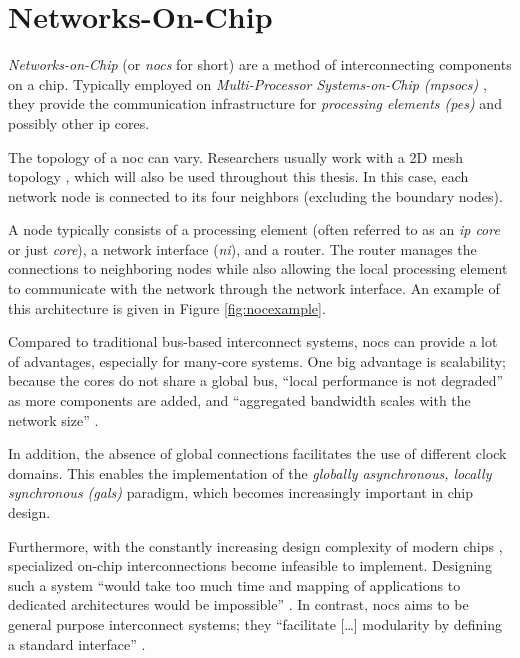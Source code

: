 \section{Networks-On-Chip}\label{sec:networkonchipfun}
\textit{Networks-on-Chip} (or \textit{\glspl{noc}} for short) are a method of interconnecting components on a chip. Typically employed on
\textit{Multi-Processor Systems-on-Chip (\glspl{mpsoc})} \cites(e.g.)(){ivanov05nocintroduction}{biswas15routerattack}{tatas16designingnocs}, they
provide the communication infrastructure for \textit{processing elements (\glspl{pe})} and possibly other \gls{ip} cores.

The topology of a \gls{noc} can vary. Researchers usually work with a 2D mesh topology
\cites(e.g.)(){frey17hardenednoc}{kumar02networkonchip}{fernandes16nocrouting}{boraten16packetsecurity}, which will also be used throughout this thesis.
In this case, each network node is connected to its four neighbors (excluding the boundary nodes).

A node typically consists of a processing element (often referred to as an \textit{\gls{ip} core} or just \textit{core}), a network interface
(\textit{\gls{ni}}), and a router. \cite{dally01routepacketsnotwires} The router manages the connections to neighboring nodes while also allowing
the local processing element to communicate with the network through the network interface. An example of this architecture is given in Figure
\vref{fig:nocexample}.

Compared to traditional bus-based interconnect systems, \glspl{noc} can provide a lot of advantages, especially for many-core systems.
\cite[5\psqq]{tatas16designingnocs} One big advantage is scalability; because the cores do not share a global bus, \enquote{local performance is not
degraded} \cite[6]{tatas16designingnocs} as more components are added, and \enquote{aggregated bandwidth scales with the network size}
\cite[6]{tatas16designingnocs}.

In addition, the absence of global connections facilitates the use of different clock domains. This enables the implementation of the
\textit{globally asynchronous, locally synchronous (\gls{gals})} paradigm, which becomes increasingly important in chip design.
\cites[3]{kumar02networkonchip}[2]{ivanov05nocintroduction}

Furthermore, with the constantly increasing design complexity of modern chips \cite{mack11mooreslaw}, specialized on-chip
interconnections become infeasible to implement. Designing such a system \enquote{would take too much time and mapping of applications to dedicated
architectures would be impossible} \cite[1]{kumar02networkonchip}. In contrast, \glspl{noc} aims to be general purpose interconnect systems; they
\enquote{facilitate […] modularity by defining a standard interface} \cite[1]{dally01routepacketsnotwires}.


